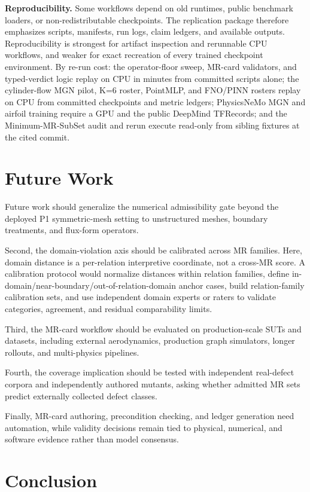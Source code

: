 \documentclass[preprint,12pt]{elsarticle}
\begin{document}
\textbf{Reproducibility.} Some workflows depend on old runtimes, public benchmark loaders, or non-redistributable checkpoints. The replication package therefore emphasizes scripts, manifests, run logs, claim ledgers, and available outputs. Reproducibility is strongest for artifact inspection and rerunnable CPU workflows, and weaker for exact recreation of every trained checkpoint environment. By re-run cost: the operator-floor sweep, MR-card validators, and typed-verdict logic replay on CPU in minutes from committed scripts alone; the cylinder-flow MGN pilot, K=6 roster, PointMLP, and FNO/PINN rosters replay on CPU from committed checkpoints and metric ledgers; PhysicsNeMo MGN and airfoil training require a GPU and the public DeepMind TFRecords; and the Minimum-MR-SubSet audit and rerun execute read-only from sibling fixtures at the cited commit.

\section{Future Work}
\label{sec:future-work}

Future work should generalize the numerical admissibility gate beyond the deployed P1 symmetric-mesh setting to unstructured meshes, boundary treatments, and flux-form operators.

Second, the domain-violation axis should be calibrated across MR families. Here, domain distance is a per-relation interpretive coordinate, not a cross-MR score. A calibration protocol would normalize distances within relation families, define in-domain/near-boundary/out-of-relation-domain anchor cases, build relation-family calibration sets, and use independent domain experts or raters to validate categories, agreement, and residual comparability limits.

Third, the MR-card workflow should be evaluated on production-scale SUTs and datasets, including external aerodynamics, production graph simulators, longer rollouts, and multi-physics pipelines.

Fourth, the coverage implication should be tested with independent real-defect corpora and independently authored mutants, asking whether admitted MR sets predict externally collected defect classes.

Finally, MR-card authoring, precondition checking, and ledger generation need automation, while validity decisions remain tied to physical, numerical, and software evidence rather than model consensus.

\section{Conclusion}
\label{sec:conclusion}
\end{document}
